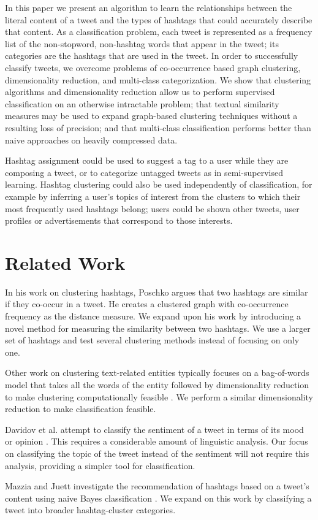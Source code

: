 In this paper we present an algorithm to learn the relationships between the literal content of a tweet and the types of hashtags that could accurately describe that content. As a classification problem, each tweet is represented as a frequency list of the non-stopword, non-hashtag words that appear in the tweet; its categories are the hashtags that are used in the tweet. In order to successfully classify tweets, we overcome problems of co-occurrence based graph clustering, dimensionality reduction, and multi-class categorization. We show that clustering algorithms and dimensionality reduction allow us to perform supervised classification on an otherwise intractable problem; that textual similarity measures may be used to expand graph-based clustering techniques without a resulting loss of precision; and that multi-class classification performs better than naive approaches on heavily compressed data.

Hashtag assignment could be used to suggest a tag to a user while they are composing a tweet, or to categorize untagged tweets as in semi-supervised learning. Hashtag clustering could also be used independently of classification, for example by inferring a user's topics of interest from the clusters to which their most frequently used hashtags belong; users could be shown other tweets, user profiles or advertisements that correspond to those interests.

\section{Related Work}
In his work on clustering hashtags, Poschko argues that two hashtags are similar if they co-occur in a tweet\cite{Poschko2011}. He creates a clustered graph with co-occurrence frequency as the distance measure. We expand upon his work by introducing a novel method for measuring the similarity between two hashtags. We use a larger set of hashtags and test several clustering methods instead of focusing on only one. 

Other work on clustering text-related entities typically focuses on a bag-of-words model that takes all the words of the entity followed by dimensionality reduction to make clustering computationally feasible \cite{Karandikar2010,Cheong2010}. We perform a similar dimensionality reduction to make classification feasible.

Davidov et al. attempt to classify the sentiment of a tweet in terms of its mood or opinion \cite{Davidov2010}. This requires a considerable amount of linguistic analysis. Our focus on classifying the topic of the tweet instead of the sentiment will not require this analysis, providing a simpler tool for classification.

Mazzia and Juett investigate the recommendation of hashtags based on a tweet's content using naive Bayes classification \cite{Mazzia2011}. We expand on this work by classifying a tweet into broader hashtag-cluster categories.